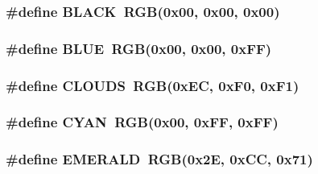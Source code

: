 \subsubsection[{B\+L\+A\+C\+K}]{\setlength{\rightskip}{0pt plus 5cm}\#define B\+L\+A\+C\+K~{\bf R\+G\+B}(0x00, 0x00, 0x00)}\label{group___s_s_d1289_ga7b3b25cba33b07c303f3060fe41887f6}
\hypertarget{group___s_s_d1289_ga79d10e672abb49ad63eeaa8aaef57c38}{}
\subsubsection[{B\+L\+U\+E}]{\setlength{\rightskip}{0pt plus 5cm}\#define B\+L\+U\+E~{\bf R\+G\+B}(0x00, 0x00, 0x\+F\+F)}\label{group___s_s_d1289_ga79d10e672abb49ad63eeaa8aaef57c38}
\hypertarget{group___s_s_d1289_ga21a063d3331bc256d5e7c757a00310b4}{}
\subsubsection[{C\+L\+O\+U\+D\+S}]{\setlength{\rightskip}{0pt plus 5cm}\#define C\+L\+O\+U\+D\+S~{\bf R\+G\+B}(0x\+E\+C, 0x\+F0, 0x\+F1)}\label{group___s_s_d1289_ga21a063d3331bc256d5e7c757a00310b4}
\hypertarget{group___s_s_d1289_gad243f93c16bc4c1d3e0a13b84421d760}{}
\subsubsection[{C\+Y\+A\+N}]{\setlength{\rightskip}{0pt plus 5cm}\#define C\+Y\+A\+N~{\bf R\+G\+B}(0x00, 0x\+F\+F, 0x\+F\+F)}\label{group___s_s_d1289_gad243f93c16bc4c1d3e0a13b84421d760}
\hypertarget{group___s_s_d1289_gabd399af25ebee3458f72f6412cae5ae4}{}
\subsubsection[{E\+M\+E\+R\+A\+L\+D}]{\setlength{\rightskip}{0pt plus 5cm}\#define E\+M\+E\+R\+A\+L\+D~{\bf R\+G\+B}(0x2\+E, 0x\+C\+C, 0x71)}\label{group___s_s_d1289_gabd399af25ebee3458f72f6412cae5ae4}
\hypertarget{group___s_s_d1289_ga0eb009d359fe9f8ec383fd9fa31f7c33}{}
